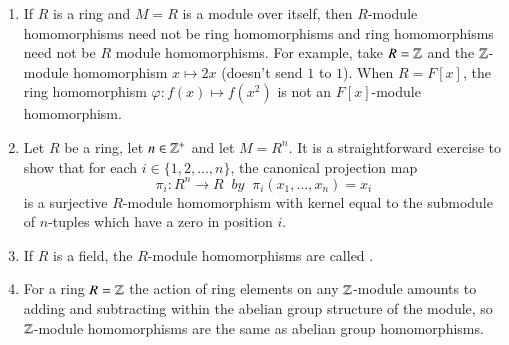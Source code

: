 \documentclass[12pt, a4paper, oneside, openright, titlepage]{book}
\begin{document}
\begin{eg}
    \leavevmode
    \begin{enumerate}
        \item If $R$ is a ring and $M = R$ is a module over itself, then $R$-module homomorphisms need not be ring homomorphisms and ring homomorphisms need not be $R$ module homomorphisms. For example, take $R = \mathbb Z$ and the $\mathbb Z$-module homomorphism $x\mapsto 2x$ (doesn't send $1$ to $1$). When $R = F[x]$, the ring homomorphism $\varphi:f(x)\mapsto f(x^2)$ is not an $F[x]$-module homomorphism.
        \item Let $R$ be a ring, let $n \in \mathbb Z^+$ and let $M = R^n$. It is a straightforward exercise to show that for each $i \in \{1,2,...,n\}$, the canonical projection map \begin{equation*}
                \pi_i:R^n\rightarrow R\;\;by\;\;\pi_i(x_1,...,x_n) = x_i
        \end{equation*}
            is a surjective $R$-module homomorphism with kernel equal to the submodule of $n$-tuples which have a zero in position $i$.
        \item If $R$ is a field, the $R$-module homomorphisms are called .
        \item For a ring $R = \mathbb Z$ the action of ring elements on any $\mathbb Z$-module amounts to adding and subtracting within the abelian group structure of the module, so $\mathbb Z$-module homomorphisms are the same as abelian group homomorphisms.
    \end{enumerate}
\end{eg}
\end{document}
